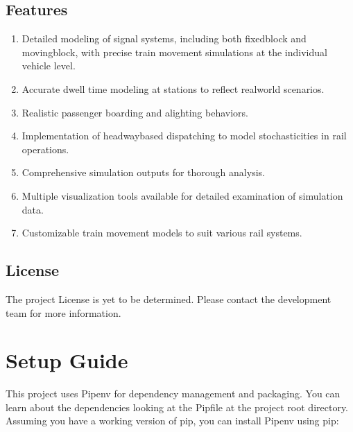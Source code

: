 \documentclass[letterpaper,10pt,english]{sphinxmanual}
\begin{document}
\section{Features}
\label{\detokenize{introduction:features}}\begin{enumerate}
%
\item {} 
\sphinxAtStartPar
Detailed modeling of signal systems, including both fixed\sphinxhyphen{}block and moving\sphinxhyphen{}block, with precise train movement simulations at the individual vehicle level.

\item {} 
\sphinxAtStartPar
Accurate dwell time modeling at stations to reflect real\sphinxhyphen{}world scenarios.

\item {} 
\sphinxAtStartPar
Realistic passenger boarding and alighting behaviors.

\item {} 
\sphinxAtStartPar
Implementation of headway\sphinxhyphen{}based dispatching to model stochasticities in rail operations.

\item {} 
\sphinxAtStartPar
Comprehensive simulation outputs for thorough analysis.

\item {} 
\sphinxAtStartPar
Multiple visualization tools available for detailed examination of simulation data.

\item {} 
\sphinxAtStartPar
Customizable train movement models to suit various rail systems.

\end{enumerate}


\section{License}
\label{\detokenize{introduction:license}}
\sphinxAtStartPar
The project License is yet to be determined. Please contact the development team for more information.

\sphinxstepscope


\chapter{Setup Guide}
\label{\detokenize{setup_guide:setup-guide}}\label{\detokenize{setup_guide::doc}}
\sphinxAtStartPar
This project uses Pipenv for dependency management and packaging. You can learn about the dependencies looking at the Pipfile at the project root directory. Assuming you have a working version of pip, you can install Pipenv using pip:
\end{document}

